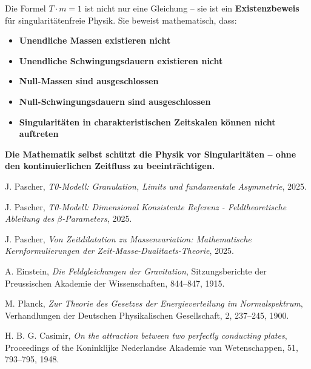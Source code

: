 \documentclass[12pt,a4paper]{article}
\theoremstyle{definition}
\theoremstyle{remark}
\begin{document}
Die Formel $T \cdot m = 1$ ist nicht nur eine Gleichung -- sie ist ein \textbf{Existenzbeweis} für singularitätenfreie Physik. Sie beweist mathematisch, dass:

\begin{itemize}
	\item \textbf{Unendliche Massen existieren nicht}
	\item \textbf{Unendliche Schwingungsdauern existieren nicht}
	\item \textbf{Null-Massen sind ausgeschlossen}
	\item \textbf{Null-Schwingungsdauern sind ausgeschlossen}
	\item \textbf{Singularitäten in charakteristischen Zeitskalen können nicht auftreten}
\end{itemize}

\textbf{Die Mathematik selbst schützt die Physik vor Singularitäten -- ohne den kontinuierlichen Zeitfluss zu beeinträchtigen.}	
	\begin{thebibliography}{99}
		J. Pascher, \textit{T0-Modell: Granulation, Limits und fundamentale Asymmetrie}, 2025.
		
		J. Pascher, \textit{T0-Modell: Dimensional Konsistente Referenz - Feldtheoretische Ableitung des $\beta$-Parameters}, 2025.
		
		J. Pascher, \textit{Von Zeitdilatation zu Massenvariation: Mathematische Kernformulierungen der Zeit-Masse-Dualitaets-Theorie}, 2025.
		
		A. Einstein, \textit{Die Feldgleichungen der Gravitation}, Sitzungsberichte der Preussischen Akademie der Wissenschaften, 844--847, 1915.
		
		M. Planck, \textit{Zur Theorie des Gesetzes der Energieverteilung im Normalspektrum}, Verhandlungen der Deutschen Physikalischen Gesellschaft, 2, 237--245, 1900.
		
		H. B. G. Casimir, \textit{On the attraction between two perfectly conducting plates}, Proceedings of the Koninklijke Nederlandse Akademie van Wetenschappen, 51, 793--795, 1948.
	\end{thebibliography}
	
\end{document}
